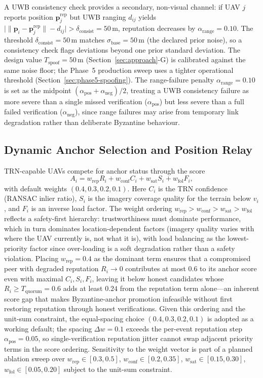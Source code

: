 \documentclass[journal,10pt,twocolumn]{IEEEtran}
\begin{document}
A UWB consistency check provides a secondary, non-visual channel: if UAV $j$ reports position $\mathbf{p}_j^\text{rep}$ but UWB ranging $d_{ij}$ yields $\bigl| \lVert \mathbf{p}_i - \mathbf{p}_j^\text{rep} \rVert - d_{ij} \bigr| > \delta_\text{consist} = 50$\,m, reputation decreases by $\alpha_\text{range} = 0.10$. The threshold $\delta_\text{consist} = 50$\,m matches $\sigma_\text{base}=50$\,m (the declared prior noise), so a consistency check flags deviations beyond one prior standard deviation. The design value $T_\text{spoof}=50$\,m (Section~\ref{sec:approach}-G) is calibrated against the same noise floor; the Phase~5 production sweep uses a tighter operational threshold (Section~\ref{sec:phase5-spoofing}). The range-failure penalty $\alpha_\text{range} = 0.10$ is set as the midpoint $(\alpha_\text{pos}+\alpha_\text{neg})/2$, treating a UWB consistency failure as more severe than a single missed verification ($\alpha_\text{pos}$) but less severe than a full failed verification ($\alpha_\text{neg}$), since range failures may arise from temporary link degradation rather than deliberate Byzantine behaviour.

\subsection{Dynamic Anchor Selection and Position Relay}

TRN-capable UAVs compete for anchor status through the score
\begin{equation}
A_i = w_\text{rep} R_i + w_\text{conf} C_i + w_\text{sat} S_i + w_\text{fol} F_i,
\label{eq:anchor_score}
\end{equation}
with default weights $(0.4, 0.3, 0.2, 0.1)$. Here $C_i$ is the TRN confidence (RANSAC inlier ratio), $S_i$ is the imagery coverage quality for the terrain below $v_i$, and $F_i$ is an inverse load factor. The weight ordering $w_\text{rep} > w_\text{conf} > w_\text{sat} > w_\text{fol}$ reflects a safety-first hierarchy: trustworthiness must dominate performance, which in turn dominates location-dependent factors (imagery quality varies with where the UAV currently is, not what it is), with load balancing as the lowest-priority factor since over-loading is a soft degradation rather than a safety violation. Placing $w_\text{rep}=0.4$ as the dominant term ensures that a compromised peer with degraded reputation $R_i\to 0$ contributes at most $0.6$ to its anchor score even with maximal $C_i, S_i, F_i$, leaving it below honest candidates whose $R_i\geq T_\text{quorum}=0.6$ adds at least $0.24$ from the reputation term alone---an inherent score gap that makes Byzantine-anchor promotion infeasible without first restoring reputation through honest verifications. Given this ordering and the unit-sum constraint, the equal-spacing choice $(0.4, 0.3, 0.2, 0.1)$ is adopted as a working default; the spacing $\Delta w = 0.1$ exceeds the per-event reputation step $\alpha_\text{pos}=0.05$, so single-verification reputation jitter cannot swap adjacent priority terms in the score ordering. Sensitivity to the weight vector is part of a planned ablation sweep over $w_\text{rep}\in[0.3, 0.5]$, $w_\text{conf}\in[0.2, 0.35]$, $w_\text{sat}\in[0.15, 0.30]$, $w_\text{fol}\in[0.05, 0.20]$ subject to the unit-sum constraint.
\end{document}
